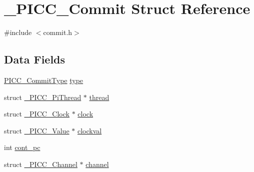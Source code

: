 \hypertarget{struct__PICC__Commit}{\section{\-\_\-\-P\-I\-C\-C\-\_\-\-Commit Struct Reference}
\label{struct__PICC__Commit}
}


{\ttfamily \#include $<$commit.\-h$>$}

\subsection*{Data Fields}
{\bf }\par
\begin{DoxyCompactItemize}
\item 
\hyperlink{commit_8h_a2293a8e8b20ef3f60159b32fb2ac6d45}{P\-I\-C\-C\-\_\-\-Commit\-Type} \hyperlink{struct__PICC__Commit_a3300308e83e1bd4843a73089906a25a9}{type}
\item 
struct \hyperlink{struct__PICC__PiThread}{\-\_\-\-P\-I\-C\-C\-\_\-\-Pi\-Thread} $\ast$ \hyperlink{struct__PICC__Commit_a32fcb5ed4aa9281f5d9e6e64e6d65e36}{thread}
\item 
struct \hyperlink{struct__PICC__Clock}{\-\_\-\-P\-I\-C\-C\-\_\-\-Clock} $\ast$ \hyperlink{struct__PICC__Commit_acf28d34611ca5566a2681238e0d105ea}{clock}
\item 
struct \hyperlink{struct__PICC__Value}{\-\_\-\-P\-I\-C\-C\-\_\-\-Value} $\ast$ \hyperlink{struct__PICC__Commit_ad26ca86d6ec9cf47f14ce4eac9d2dfaf}{clockval}
\item 
int \hyperlink{struct__PICC__Commit_a880e72c43ee08a0eaad3ebc3234bc612}{cont\-\_\-pc}
\item 
struct \hyperlink{struct__PICC__Channel}{\-\_\-\-P\-I\-C\-C\-\_\-\-Channel} $\ast$ \hyperlink{struct__PICC__Commit_af80b43fa7c7a1fee8446a6b2efdaab03}{channel}
\end{DoxyCompactItemize}

